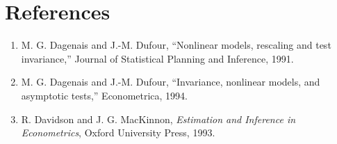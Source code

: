 \documentclass[10pt,journal,compsoc]{IEEEtran}
\begin{document}
\section*{References}
\begin{small}
\begin{enumerate}
    \item M. G. Dagenais and J.-M. Dufour, ``Nonlinear models, rescaling and test invariance,'' Journal of Statistical Planning and Inference, 1991.
    \item M. G. Dagenais and J.-M. Dufour, ``Invariance, nonlinear models, and asymptotic tests,'' Econometrica, 1994.
    \item R. Davidson and J. G. MacKinnon, \textit{Estimation and Inference in Econometrics}, Oxford University Press, 1993.
\end{enumerate}
\end{small}
\end{document}
